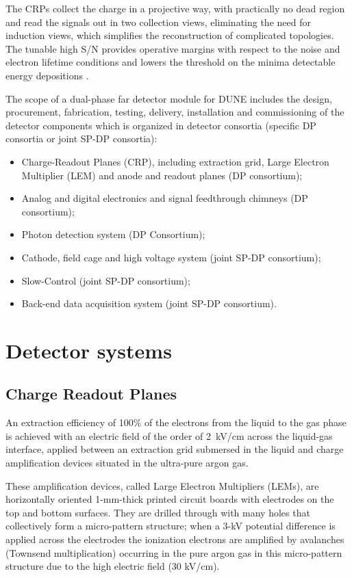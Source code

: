 The CRPs collect the charge in a projective way,  with practically no dead region and read the signals out  in two collection views, eliminating the need for  induction views, which  simplifies the reconstruction of complicated topologies. The tunable high S/N provides operative margins with respect to the noise and electron lifetime conditions and lowers the threshold on the minima  detectable energy depositions .

The scope of a dual-phase far detector module for DUNE includes the design, procurement, fabrication, testing, delivery, installation and
commissioning of the detector components which is organized in detector consortia (specific DP consortia or joint SP-DP consortia):

\begin{itemize}
\item Charge-Readout Planes (CRP), including extraction grid, Large Electron Multiplier (LEM) and anode and readout planes (DP consortium);
\item Analog and digital electronics and signal feedthrough chimneys (DP consortium); 
\item Photon detection system (DP Consortium);
\item Cathode, field cage and high voltage system (joint SP-DP consortium);  
\item Slow-Control (joint SP-DP consortium); 
\item Back-end data acquisition system (joint SP-DP consortium).
\end{itemize}

\section{Detector systems}
\label{sec:fddp-ov-systems}

\subsection{Charge Readout Planes}
\label{v4:fddp-ov:crp}

An extraction efficiency of 100\% of the electrons from the liquid to the gas phase is achieved with an electric field of the order of 2~kV/cm across the liquid-gas interface, applied between an  extraction grid submersed in the liquid and charge amplification  devices situated in the ultra-pure argon gas. 

These amplification devices, called Large Electron Multipliers (LEMs), are horizontally  oriented 1-mm-thick printed  circuit boards with electrodes on the top and bottom surfaces. They are drilled through with many holes that collectively form a micro-pattern structure;  when a 3-kV potential difference is applied across the electrodes the ionization electrons are amplified by avalanches (Townsend multiplication) occurring in the  pure argon gas in this micro-pattern structure due to the high electric field (30 kV/cm).

